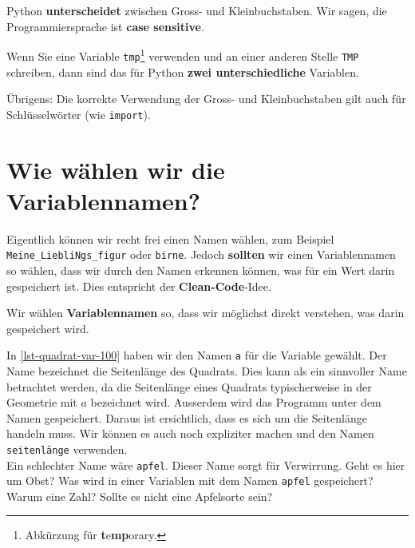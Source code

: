\begin{important}
Python \textbf{unterscheidet} zwischen Gross- und Kleinbuchstaben. Wir sagen, die Programmiersprache ist \textbf{case sensitive}.
\end{important}

\begin{example}
	Wenn Sie eine Variable \lstinline{tmp}\footnote{Abkürzung für \textbf{t}e\textbf{mp}orary.} verwenden und an einer anderen Stelle \lstinline{TMP} schreiben, dann sind das für Python \textbf{zwei unterschiedliche} Variablen. 
\end{example}

Übrigens: Die korrekte Verwendung der Gross- und Kleinbuchstaben gilt auch für Schlüsselwörter (wie \lstinline{import}).

\section{Wie wählen wir die Variablennamen?}

Eigentlich können wir recht frei einen Namen wählen, zum Beispiel \lstinline{Meine_LiebliNgs_figur} oder \lstinline{birne}. Jedoch \textbf{sollten} wir einen Variablennamen so wählen, dass wir durch den Namen erkennen können, was für ein Wert darin gespeichert ist. Dies entspricht der \textbf{Clean-Code}-Idee.

\begin{cleancode}
Wir wählen \textbf{Variablennamen} so, dass wir möglichst direkt verstehen, was darin gespeichert wird.
\end{cleancode}

\begin{example}
In \autoref{lst-quadrat-var-100} haben wir den Namen \lstinline{a} für die Variable gewählt. Der Name bezeichnet die Seitenlänge des Quadrats. Dies kann als ein sinnvoller Name betrachtet werden, da die Seitenlänge eines Quadrats typischerweise in der Geometrie mit $a$ bezeichnet wird. Ausserdem wird das Programm unter dem Namen  gespeichert. Daraus ist ersichtlich, dass es sich um die Seitenlänge handeln muss. Wir können es auch noch expliziter machen und den Namen \lstinline{seitenlänge} verwenden.\\
Ein schlechter Name wäre \lstinline{apfel}. Dieser Name sorgt für Verwirrung. Geht es hier um Obst? Was wird in einer Variablen mit dem Namen \lstinline{apfel} gespeichert? Warum eine Zahl? Sollte es nicht eine Apfelsorte sein?
\end{example}

